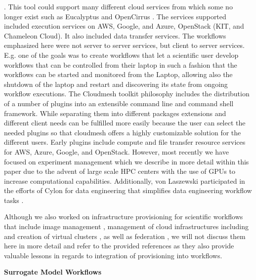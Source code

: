 \documentclass[utf8]{FrontiersinVancouver} %
\newcommand{\TODO}[1]{\todo[inline]{#1}}
\begin{document}
\citep{las-04-ftp-journal}
\citep{las-03-ftp}.
This tool could support many different cloud services from which some no longer exist such as Eucalyptus \cite{eucalyptus} and OpenCirrus \cite{opencirrus}. The services supported included execution services on AWS, Google, and Azure, OpenStack (KIT, and Chameleon Cloud). It also included data transfer services. The workflows emphasized here were not server to server services, but client to server services. E.g. one of the goals was to create workflows that let a scientific user develop workflows that can be controlled from their laptop in such a fashion that the workflows can be started and monitored from the Laptop, allowing also the shutdown of the laptop and restart and discovering its state from ongoing workflow executions. 
The Cloudmesh toolkit \citep{las-17-cloudmesh} philosophy includes the distribution of a number of plugins into an extensible command line and command shell framework. While separating them into different packages extensions and different client needs can be fulfilled more easily because the user can select the needed plugins so that cloudmesh offers a highly customizable solution for the different users. Early plugins include compute and file transfer resource services for AWS, Azure, Google, and OpenStack. However, most recently we have focused on experiment management which we describe in more detail within this paper due to the advent of large scale HPC centers with the use of GPUs to increase computational capabilities. 
Additionally, von Laszewski participated in the efforts of Cylon for data engineering that simplifies data engineering workflow tasks \citep{cylon,cylon-radical}. 


Although we also worked on infrastructure provisioning for scientific
workflows that include image management
\citep{las-12-imagemanagement}, management of cloud infrastructures
including \citep{las-20-10gce,las-14-bigdata,las-12-fg-bookchapter}
\citep{las-17-futuregrid} and creation of virtual clusters
\citep{las-16-virtcluster,las-19-harc-comet}, as well as federation
\citep{las-08-federated-cloud}, we will not discuss them here in more
detail and refer to the provided references as they also provide
valuable lessons in regards to integration of provisioning into
workflows.


   
{\bf Surrogate Model Workflows}
\end{document}
